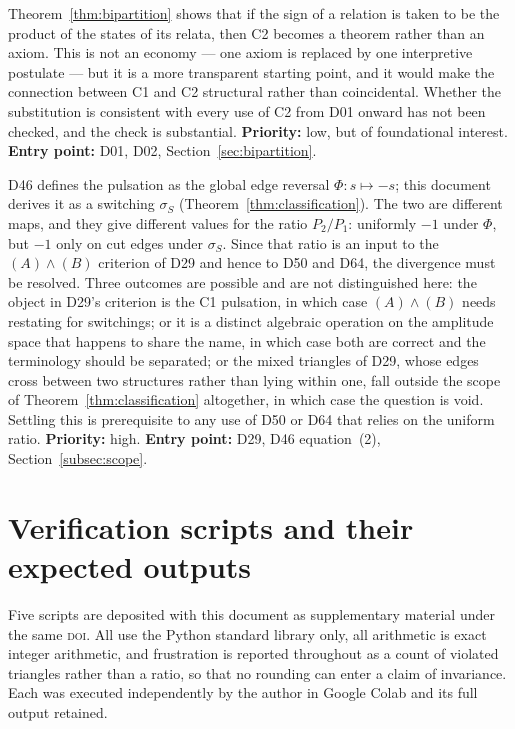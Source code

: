 \documentclass[11pt,a4paper]{article}
\begin{document}
\begin{openprobbox}
Theorem~\ref{thm:bipartition} shows that if the sign of a relation is taken to be the product of the states of its relata, then C2 becomes a theorem rather than an axiom. This is not an economy --- one axiom is replaced by one interpretive postulate --- but it is a more transparent starting point, and it would make the connection between C1 and C2 structural rather than coincidental. Whether the substitution is consistent with every use of C2 from D01 onward has not been checked, and the check is substantial. \textbf{Priority:} low, but of foundational interest. \textbf{Entry point:} D01, D02, Section~\ref{sec:bipartition}.
\end{openprobbox}

\begin{openprobbox}
D46 defines the pulsation as the global edge reversal $\Phi:s\mapsto-s$; this document derives it as a switching $\sigma_S$ (Theorem~\ref{thm:classification}). The two are different maps, and they give different values for the ratio $P_2/P_1$: uniformly $-1$ under $\Phi$, but $-1$ only on cut edges under $\sigma_S$. Since that ratio is an input to the $(A)\wedge(B)$ criterion of D29 and hence to D50 and D64, the divergence must be resolved. Three outcomes are possible and are not distinguished here: the object in D29's criterion is the C1 pulsation, in which case $(A)\wedge(B)$ needs restating for switchings; or it is a distinct algebraic operation on the amplitude space that happens to share the name, in which case both are correct and the terminology should be separated; or the mixed triangles of D29, whose edges cross between two structures rather than lying within one, fall outside the scope of Theorem~\ref{thm:classification} altogether, in which case the question is void. Settling this is prerequisite to any use of D50 or D64 that relies on the uniform ratio. \textbf{Priority:} high. \textbf{Entry point:} D29, D46 equation~(2), Section~\ref{subsec:scope}.
\end{openprobbox}

\section{Verification scripts and their expected outputs}
\label{sec:scripts}

Five scripts are deposited with this document as supplementary material under the same \textsc{doi}. All use the Python standard library only, all arithmetic is exact integer arithmetic, and frustration is reported throughout as a count of violated triangles rather than a ratio, so that no rounding can enter a claim of invariance. Each was executed independently by the author in Google Colab and its full output retained.
\end{document}
